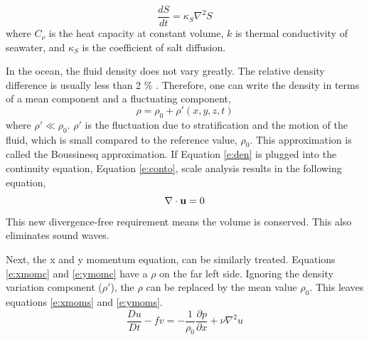\begin{equation*}\label{e:salt}
    \frac{dS}{dt} = \kappa_S \nabla^2 S
\end{equation*}
%
where $C_{\nu}$ is the heat capacity at constant volume, $k$ is thermal conductivity of seawater, and $\kappa_S$ is the coefficient of salt diffusion.  

In the ocean, the fluid density does not vary greatly.  The relative density difference is usually less than 2 \% \cite{94CushRoi}.  Therefore, one can write the density in terms of a mean component and a fluctuating component,
%
\begin{equation}\label{e:den}
    \rho = \rho_0 + \rho ' (x, y, z, t)
\end{equation}
%
where $\rho ' \ll \rho_0$.  $\rho '$ is the fluctuation due to stratification and the motion of the fluid, which is small compared to the reference value, $\rho_0$.  This approximation is called the Boussinesq approximation.  If Equation \ref{e:den} is plugged into the continuity equation, Equation \protect \ref{e:conto}, scale analysis results in the following equation, 
%
\begin{equation}\label{e:cont}
    \nabla \cdot {\bf u} = 0
\end{equation}
%
This new divergence-free requirement means the volume is conserved.  This also eliminates sound waves.

Next, the x and y momentum equation, can be similarly treated.  Equations \protect \ref{e:xmomc} and \protect \ref{e:ymomc} have a $\rho$ on the far left side.  Ignoring the density variation component ($\rho '$), the $\rho$ can be replaced by the mean value $\rho_0$.  This leaves equations \protect \ref{e:xmoms} and \protect \ref{e:ymoms}.
%
\begin{equation}\label{e:xmoms}
     \frac{Du}{Dt} - fv = - \frac{1}{\rho_0} \frac{\partial p}{\partial x} + \nu \nabla^2 u
\end{equation}

